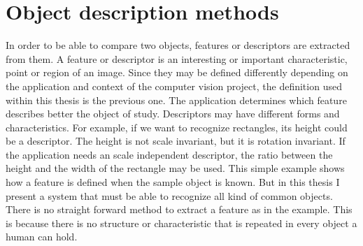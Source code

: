 \section{Object description methods}
\label{descriptors}
In order to be able to compare two objects, features or descriptors are extracted from them. 
A feature or descriptor is an interesting or important characteristic, point or region of an image. 
Since they may be defined differently depending on the application and context of the computer vision project, the definition used within this thesis is the previous one. 
The application determines which feature describes better the object of study. 
Descriptors may have different forms and characteristics. 
For example, if we want to recognize rectangles, its height could be a descriptor.
The height is not scale invariant, but it is rotation invariant. 
If the application needs an scale independent descriptor, the ratio between the height and the width of the rectangle may be used. 
This simple example shows how a feature is defined when the sample object is known. 
But in this thesis I present a system that must be able to recognize all kind of common objects. 
There is no straight forward method to extract a feature as in the example. 
This is because there is no structure or characteristic that is repeated in every object a human can hold. 
 
\\

